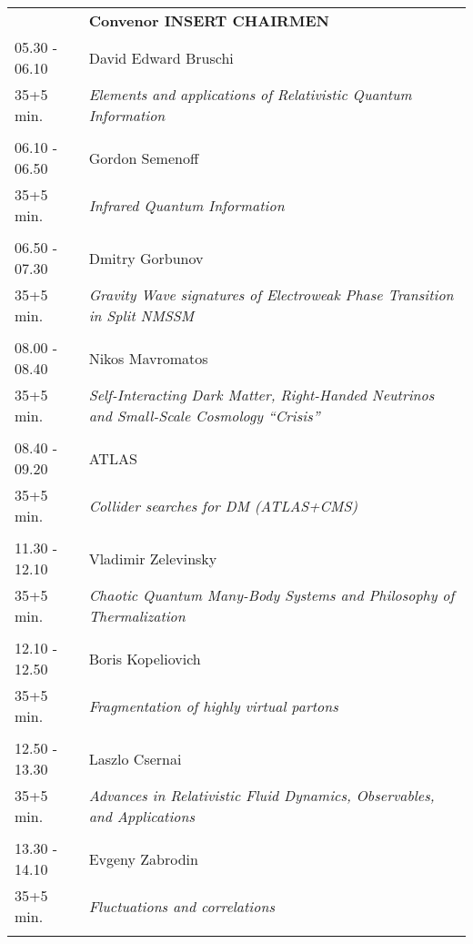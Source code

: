 \begin{longtable}{p{3cm}p{13cm}}
&\hfill {\bf Convenor INSERT CHAIRMEN }\\ 
05.30 - 06.10 & David Edward Bruschi\\ 
35+5 min. & {\it Elements and applications of Relativistic Quantum Information}\\ 
 & \\ 
06.10 - 06.50 & Gordon Semenoff\\ 
35+5 min. & {\it Infrared Quantum Information}\\ 
 & \\ 
06.50 - 07.30 & Dmitry Gorbunov\\ 
35+5 min. & {\it Gravity Wave signatures of Electroweak Phase Transition in Split NMSSM}\\ 
 & \\ 
08.00 - 08.40 & Nikos Mavromatos\\ 
35+5 min. & {\it Self-Interacting Dark Matter, Right-Handed Neutrinos and Small-Scale Cosmology ``Crisis''}\\ 
 & \\ 
08.40 - 09.20 & ATLAS\\ 
35+5 min. & {\it Collider searches for DM (ATLAS+CMS)}\\ 
 & \\ 
11.30 - 12.10 & Vladimir Zelevinsky\\ 
35+5 min. & {\it Chaotic Quantum Many-Body Systems and Philosophy of Thermalization}\\ 
 & \\ 
12.10 - 12.50 & Boris Kopeliovich\\ 
35+5 min. & {\it Fragmentation of highly virtual partons}\\ 
 & \\ 
12.50 - 13.30 & Laszlo Csernai\\ 
35+5 min. & {\it Advances in Relativistic Fluid Dynamics, Observables, and Applications}\\ 
 & \\ 
13.30 - 14.10 & Evgeny Zabrodin\\ 
35+5 min. & {\it Fluctuations and correlations}\\ 
 & \\ 
\end{longtable}

